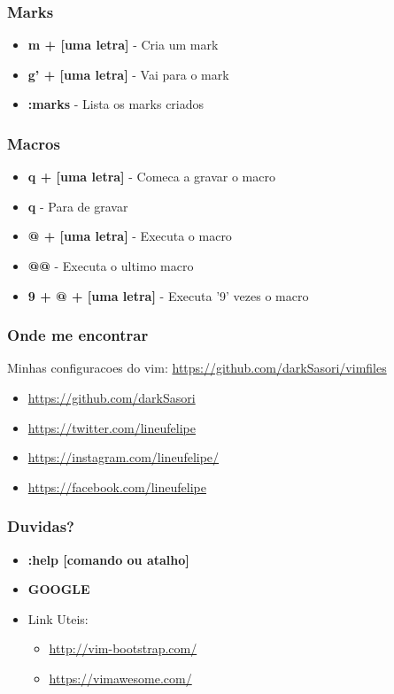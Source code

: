 \documentclass[aspectratio=169]{beamer}
\begin{document}
\begin{frame}\frametitle{Marks}
    \begin{itemize}
        \item \textbf{m + [uma letra]} - Cria um mark
        \item \textbf{g' + [uma letra]} - Vai para o mark
        \item \textbf{:marks} - Lista os marks criados
    \end{itemize}
\end{frame}

\begin{frame}\frametitle{Macros}
    \begin{itemize}
        \item \textbf{q + [uma letra]} - Comeca a gravar o macro
        \item \textbf{q} - Para de gravar
        \item \textbf{@ + [uma letra]} - Executa o macro
        \item \textbf{@@} - Executa o ultimo macro
        \item \textbf{9 + @ + [uma letra]} - Executa '9' vezes o macro
    \end{itemize}
\end{frame}

\begin{frame}\frametitle{Onde me encontrar}
    Minhas configuracoes do vim:
    \url{https://github.com/darkSasori/vimfiles}
    \begin{itemize}
        \item \url{https://github.com/darkSasori}
        \item \url{https://twitter.com/lineufelipe}
        \item \url{https://instagram.com/lineufelipe/}
        \item \url{https://facebook.com/lineufelipe}
    \end{itemize}
\end{frame}

\begin{frame}\frametitle{Duvidas?}
    \pause
    \begin{itemize}
        \item <1-> \textbf{:help [comando ou atalho]} \pause
        \item <2-> \textbf{GOOGLE}
        \item <3->Link Uteis:
            \begin{itemize}
                \item \url{http://vim-bootstrap.com/}
                \item \url{https://vimawesome.com/}
            \end{itemize}
    \end{itemize}
\end{frame}
\end{document}
